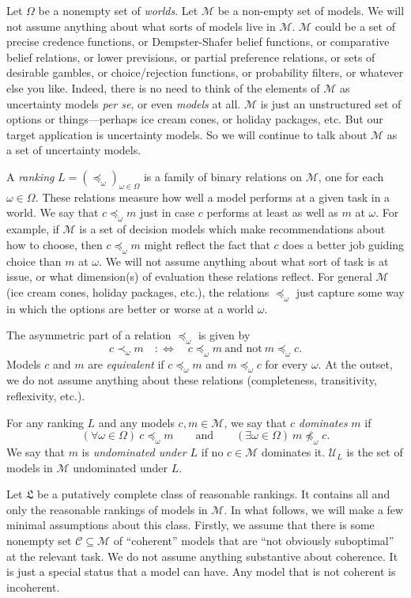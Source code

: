 \documentclass[11pt]{article}
\theoremstyle{definition}
\theoremstyle{remark}
\newcommand{\M}{\mathcal M}
\newcommand{\C}{\mathcal C}
\newcommand{\U}{\mathcal U}
\newcommand{\Lf}{\mathfrak L}
\begin{document}
Let $\Omega$ be a nonempty set of \emph{worlds}. Let $\M$ be a non-empty set of models. We will not assume anything about what sorts of models live in $\M$. $\M$ could be a set of precise credence functions, or Dempster-Shafer belief functions, or comparative belief relations, or lower previsions, or partial preference relations, or sets of desirable gambles, or choice/rejection functions, or probability filters, or whatever else you like. Indeed, there is no need to think of the elements of $\M$ as uncertainty models \textit{per se}, or even \textit{models} at all. $\M$ is just an unstructured set of options or things---perhaps ice cream cones, or holiday packages, etc. But our target application is uncertainty models. So we will continue to talk about $\M$ as a set of uncertainty models.




A \emph{ranking} $L=(\preceq_\omega)_{\omega\in\Omega}$ is a family of binary relations on $\M$, one for each $\omega\in\Omega$. These relations measure how well a model performs at a given task in a world. We say that $c\preceq_\omega m$ just in case $c$ performs at least as well as $m$ at $\omega$. For example, if $\M$ is a set of decision models which make recommendations about how to choose, then $c\preceq_\omega m$ might reflect the fact that $c$ does a better job guiding choice than $m$ at $\omega$. We will not assume anything about what sort of task is at issue, or what dimension(s) of evaluation these relations reflect. For general $\M$ (ice cream cones, holiday packages, etc.), the relations $\preceq_\omega$ just capture some way in which the options are better or worse at a world $\omega$.

The asymmetric part of a relation $\preceq_\omega$ is given by
\[
c\prec_\omega m\quad:\Longleftrightarrow\quad c\preceq_\omega m\ \text{and not}\ m\preceq_\omega c .
\]
Models $c$ and $m$ are \emph{equivalent} if $c\preceq_\omega m$ and $m\preceq_\omega c$ for every $\omega$. At the outset, we do not assume anything about these relations (completeness, transitivity, reflexivity, etc.).

For any ranking $L$ and any models $c,m\in\M$, we say that $c$ \emph{dominates} $m$ if
\[
(\forall\omega\in\Omega)\ c\preceq_\omega m\qquad\text{and}\qquad(\exists\omega\in\Omega)\ m\not\preceq_\omega c .
\]
We say that $m$ is \emph{undominated under $L$} if no $c\in\M$ dominates it. $\U_L$ is the set of models in $\M$ undominated under $L$.

Let $\Lf$ be a putatively complete class of reasonable rankings. It contains all and only the reasonable rankings of models in $\M$. In what follows, we will make a few minimal assumptions about this class. Firstly, we assume that there is some nonempty set $\C\subseteq\M$ of ``coherent'' models that are ``not obviously suboptimal'' at the relevant task. We do not assume anything substantive about coherence. It is just a special status that a model can have. Any model that is not coherent is incoherent. 
\end{document}
